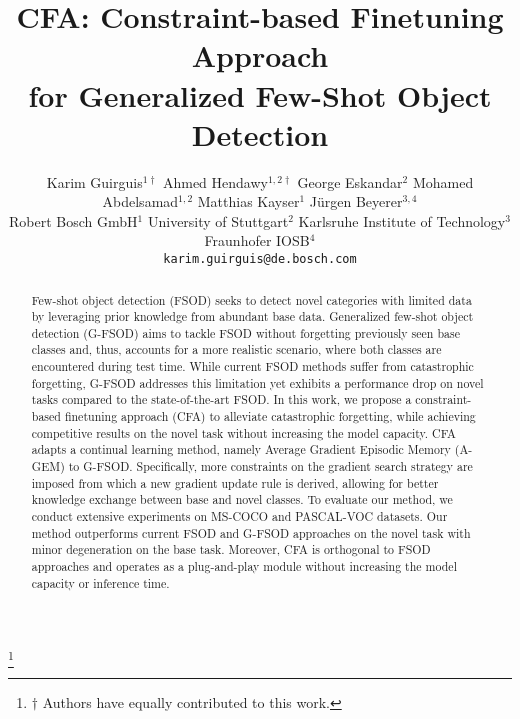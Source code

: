 \documentclass[10pt,twocolumn,letterpaper]{article}
\newcommand\blfootnote[1]{\begingroup
  \renewcommand\thefootnote{}\footnote{#1}\addtocounter{footnote}{-1}\endgroup
}
\begin{document}
\title{CFA: Constraint-based Finetuning Approach \\ for Generalized Few-Shot Object Detection}

\author{{\normalsize Karim Guirguis}$^{1 \dagger}$ \hspace{0.1em} {\normalsize Ahmed Hendawy}$^{1,2 \dagger}$ \hspace{0.1em}  {\normalsize George Eskandar}$^{2}$ \hspace{0.1em}  {\normalsize Mohamed Abdelsamad}$^{1,2}$ \hspace{0.1em}  {\normalsize Matthias Kayser}$^{1}$ \hspace{0.1em}  {\normalsize J\"urgen Beyerer}$^{3,4}$\\
{\normalsize Robert Bosch GmbH}$^1$ \hspace{0.2em} {\normalsize University of Stuttgart}$^2$ \hspace{0.2em} {\normalsize Karlsruhe Institute of Technology}$^3$ \hspace{0.2em} {\normalsize Fraunhofer IOSB}$^4$ \\
{\tt\small karim.guirguis@de.bosch.com}
}
\maketitle

\begin{abstract}
Few-shot object detection (FSOD) seeks to detect novel categories with limited data by leveraging prior knowledge from abundant base data. Generalized few-shot object detection (G-FSOD) aims to tackle FSOD without forgetting previously seen base classes and, thus, accounts for a more realistic scenario, where both classes are encountered during test time. While current FSOD methods suffer from catastrophic forgetting, G-FSOD addresses this limitation yet exhibits a performance drop on novel tasks compared to the state-of-the-art FSOD. In this work, we propose a constraint-based finetuning approach (CFA) to alleviate catastrophic forgetting, while achieving competitive results on the novel task without increasing the model capacity. CFA adapts a continual learning method, namely Average Gradient Episodic Memory (A-GEM) to G-FSOD. Specifically, more constraints on the gradient search strategy are imposed from which a new gradient update rule is derived, allowing for better knowledge exchange between base and novel classes. To evaluate our method, we conduct extensive experiments on MS-COCO and PASCAL-VOC datasets. Our method outperforms current FSOD and G-FSOD approaches on the novel task with minor degeneration on the base task. Moreover, CFA is orthogonal to FSOD approaches and operates as a plug-and-play module without increasing the model capacity or inference time.
\end{abstract}
\blfootnote{$\dagger$ Authors have equally contributed to this work.}
\end{document}
